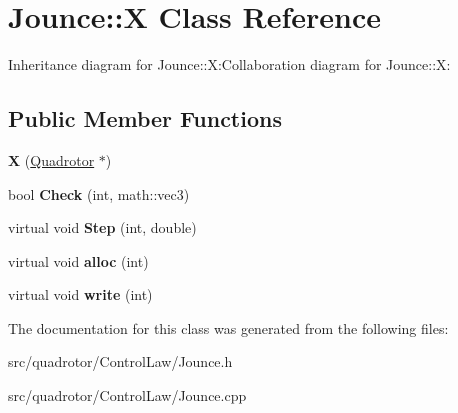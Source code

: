 \hypertarget{classJounce_1_1X}{
\section{Jounce::X Class Reference}
\label{classJounce_1_1X}
}
Inheritance diagram for Jounce::X:Collaboration diagram for Jounce::X:\subsection*{Public Member Functions}
\begin{DoxyCompactItemize}
\item 
\hypertarget{classJounce_1_1X_a8a32e0c522fceca1c238f090f199703f}{
{\bfseries X} (\hyperlink{classQuadrotor}{Quadrotor} $\ast$)}
\label{classJounce_1_1X_a8a32e0c522fceca1c238f090f199703f}

\item 
\hypertarget{classJounce_1_1X_a5517653cfa6e81ceca032d1692e36842}{
bool {\bfseries Check} (int, math::vec3)}
\label{classJounce_1_1X_a5517653cfa6e81ceca032d1692e36842}

\item 
\hypertarget{classJounce_1_1X_aa37ceb36cb1a026f825e02c329f3c56e}{
virtual void {\bfseries Step} (int, double)}
\label{classJounce_1_1X_aa37ceb36cb1a026f825e02c329f3c56e}

\item 
\hypertarget{classJounce_1_1X_a531bc708807c552fbc3d28a6ac0c11a5}{
virtual void {\bfseries alloc} (int)}
\label{classJounce_1_1X_a531bc708807c552fbc3d28a6ac0c11a5}

\item 
\hypertarget{classJounce_1_1X_ad860d72f6b64207c6e8ba9927e1ea55c}{
virtual void {\bfseries write} (int)}
\label{classJounce_1_1X_ad860d72f6b64207c6e8ba9927e1ea55c}

\end{DoxyCompactItemize}


The documentation for this class was generated from the following files:\begin{DoxyCompactItemize}
\item 
src/quadrotor/ControlLaw/Jounce.h\item 
src/quadrotor/ControlLaw/Jounce.cpp\end{DoxyCompactItemize}
